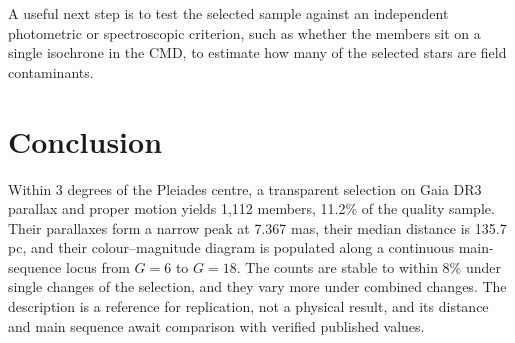 \documentclass[11pt]{article}
\begin{document}
A useful next step is to test the selected sample against an independent photometric or spectroscopic criterion, such as whether the members sit on a single isochrone in the CMD, to estimate how many of the selected stars are field contaminants.

\section{Conclusion}

Within 3 degrees of the Pleiades centre, a transparent selection on Gaia DR3 parallax and proper motion yields 1,112 members, 11.2\% of the quality sample. Their parallaxes form a narrow peak at 7.367 mas, their median distance is 135.7 pc, and their colour--magnitude diagram is populated along a continuous main-sequence locus from $G = 6$ to $G = 18$. The counts are stable to within 8\% under single changes of the selection, and they vary more under combined changes. The description is a reference for replication, not a physical result, and its distance and main sequence await comparison with verified published values.



\end{document}

